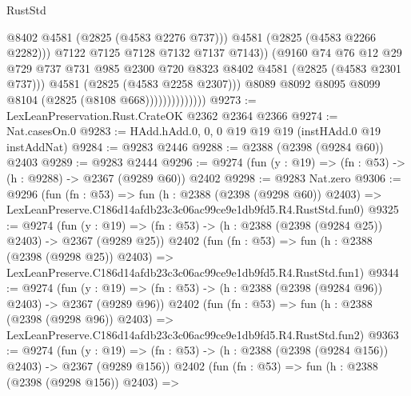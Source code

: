 \begin{lexlean}{RustStd}
\begin{coremodule}
                                      @8402
                                      @4581
                                      (@2825 (@4583 @2276 @737)))
                                    @4581
                                    (@2825 (@4583 @2266 @2282)))
                                  @7122
                                  @7125
                                  @7128
                                  @7132
                                  @7137
                                  @7143))
                              (@9160
                                @74
                                @76
                                @12
                                @29
                                @729
                                @737
                                @731
                                @985
                                @2300
                                @720
                                @8323
                                @8402
                                @4581
                                (@2825 (@4583 @2301 @737)))
                              @4581
                              (@2825 (@4583 @2258 @2307)))
                            @8089
                            @8092
                            @8095
                            @8099
                            @8104
                            (@2825 (@8108 @668))))))))))))))
@9273 := LexLeanPreservation.Rust.CrateOK @2362 @2364 @2366
@9274 := Nat.casesOn.{0}
@9283 := HAdd.hAdd.{0, 0, 0} @19 @19 @19 (instHAdd.{0} @19 instAddNat)
@9284 := @9283 @2446
@9288 := @2388 (@2398 (@9284 @60)) @2403
@9289 := @9283 @2444
@9296 := @9274 (fun (y : @19) => (fn : @53) -> (h : @9288) -> @2367 (@9289 @60)) @2402
@9298 := @9283 Nat.zero
@9306 := @9296
    (fun (fn : @53) =>
    fun (h : @2388 (@2398 (@9298 @60)) @2403) =>
    LexLeanPreserve.C186d14afdb23c3c06ac99ce9e1db9fd5.R4.RustStd.fun0)
@9325 := @9274
    (fun (y : @19) => (fn : @53) -> (h : @2388 (@2398 (@9284 @25)) @2403) -> @2367 (@9289 @25))
    @2402
    (fun (fn : @53) =>
    fun (h : @2388 (@2398 (@9298 @25)) @2403) =>
    LexLeanPreserve.C186d14afdb23c3c06ac99ce9e1db9fd5.R4.RustStd.fun1)
@9344 := @9274
    (fun (y : @19) => (fn : @53) -> (h : @2388 (@2398 (@9284 @96)) @2403) -> @2367 (@9289 @96))
    @2402
    (fun (fn : @53) =>
    fun (h : @2388 (@2398 (@9298 @96)) @2403) =>
    LexLeanPreserve.C186d14afdb23c3c06ac99ce9e1db9fd5.R4.RustStd.fun2)
@9363 := @9274
    (fun (y : @19) => (fn : @53) -> (h : @2388 (@2398 (@9284 @156)) @2403) -> @2367 (@9289 @156))
    @2402
    (fun (fn : @53) =>
    fun (h : @2388 (@2398 (@9298 @156)) @2403) =>

\end{coremodule}
\end{lexlean}
